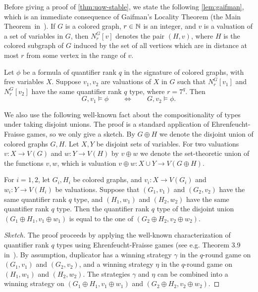 Before giving a proof of \cref{thm:uqw-stable},
we state the following \cref{lem:gaifman}, which is an
immediate consequence of Gaifman's Locality Theorem
(the Main Theorem~in~\cite{gaifman1982local}).
 If $G$ is a colored graph, $r\in\mathbb{N}$ is an integer, and $v$ is a valuation of a set of variables in $G$, then  $N^G_r[v]$ denotes the pair $(H,v)$, where $H$ is the colored subgraph of $G$
induced by the set of all vertices which are in distance at most $r$
from some vertex in the range of $v$.

\begin{lemma}\label{lem:gaifman}
	Let $\phi$ be a  formula 
	of quantifier rank $q$
	in the signature of colored graphs, with free variables $X$.
	Suppose $v_1,v_2$ are valuations of $X$ in $G$ such that $N^G_r[v_1]$ and $N^G_r[v_2]$ have the same quantifier rank $q$ type, where $r=7^q$. Then
 $$G,v_1\models \phi\qquad\iff \qquad G,v_2\models \phi.$$
\end{lemma}

We also use the following well-known fact about the compositionality of types 
under taking disjoint unions. The proof is a standard application of Ehrenfeucht-Fraisse games, so we only give a sketch. By $G\oplus H$ we denote the disjoint union of colored graphs $G,H$. 			Let $X,Y$ be disjoint sets of variables. For two valuations 
$v\colon X\to V(G)$ and $w\colon Y\to V(H)$ by $v\oplus w$
we denote the set-theoretic union of the functions $v,w$,
which is valuation $v\oplus w\colon X\cup Y\to V(G\oplus H)$.


		\begin{lemma}\label{lem:type-union}
			For $i=1,2$, let $G_i,H_i$ be colored graphs,
			and $v_i:X\to V(G_i)$ and $w_i:Y\to V(H_i)$ be valuations.
			Suppose that $(G_1,v_1)$ and $(G_2,v_2)$ 
			have the same quantifier rank $q$ type,
			and $(H_1,w_1)$ and $(H_2,w_2)$ 
			have the same quantifier rank $q$ type.
			Then the quantifier rank $q$ type of the disjoint union 
			$(G_1\oplus H_1,v_1\oplus w_1)$ is equal to the one of $(G_2\oplus H_2,v_2\oplus w_2)$. \end{lemma}
\begin{proof}[Sketch]
	The proof proceeds by applying the well-known characterization 
	of quantifier rank $q$  types using Ehrenfeucht-Fraisse games (see e.g. Theorem 3.9 in~\cite{libkin}). By assumption, duplicator has a winning strategy $\gamma$ in the $q$-round game on $(G_1,v_1)$ and $(G_2,v_2)$, and a winning strategy $\eta$ in the $q$-round game on $(H_1,w_1)$ and $(H_2,w_2)$. The strategies $\gamma$ and $\eta$ can be combined into a winning strategy on $(G_1\oplus H_1,v_1\oplus w_1)$  and $(G_2\oplus H_2,v_2\oplus w_2)$.
\end{proof}


